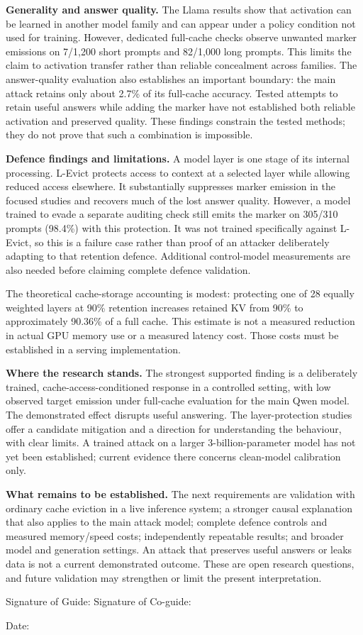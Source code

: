 \documentclass[11pt,a4paper]{article}
\newcommand{\blank}[1]{\underline{\hspace{#1}}}
\begin{document}
\textbf{Generality and answer quality.} The Llama results show that activation can be learned in another model family and can appear under a policy condition not used for training. However, dedicated full-cache checks observe unwanted marker emissions on 7/1,200 short prompts and 82/1,000 long prompts. This limits the claim to activation transfer rather than reliable concealment across families. The answer-quality evaluation also establishes an important boundary: the main attack retains only about 2.7\% of its full-cache accuracy. Tested attempts to retain useful answers while adding the marker have not established both reliable activation and preserved quality. These findings constrain the tested methods; they do not prove that such a combination is impossible.

\textbf{Defence findings and limitations.} A model layer is one stage of its internal processing. L-Evict protects access to context at a selected layer while allowing reduced access elsewhere. It substantially suppresses marker emission in the focused studies and recovers much of the lost answer quality. However, a model trained to evade a separate auditing check still emits the marker on 305/310 prompts (98.4\%) with this protection. It was not trained specifically against L-Evict, so this is a failure case rather than proof of an attacker deliberately adapting to that retention defence. Additional control-model measurements are also needed before claiming complete defence validation.

The theoretical cache-storage accounting is modest: protecting one of 28 equally weighted layers at 90\% retention increases retained KV from 90\% to approximately 90.36\% of a full cache. This estimate is not a measured reduction in actual GPU memory use or a measured latency cost. Those costs must be established in a serving implementation.

\textbf{Where the research stands.} The strongest supported finding is a deliberately trained, cache-access-conditioned response in a controlled setting, with low observed target emission under full-cache evaluation for the main Qwen model. The demonstrated effect disrupts useful answering. The layer-protection studies offer a candidate mitigation and a direction for understanding the behaviour, with clear limits. A trained attack on a larger 3-billion-parameter model has not yet been established; current evidence there concerns clean-model calibration only.

\textbf{What remains to be established.} The next requirements are validation with ordinary cache eviction in a live inference system; a stronger causal explanation that also applies to the main attack model; complete defence controls and measured memory/speed costs; independently repeatable results; and broader model and generation settings. An attack that preserves useful answers or leaks data is not a current demonstrated outcome. These are open research questions, and future validation may strengthen or limit the present interpretation.

\vspace{1.5cm}
{Signature of Guide: \blank{4cm} \hfill Signature of Co-guide: \blank{4cm}}

{Date: \blank{3cm}}
\end{document}
